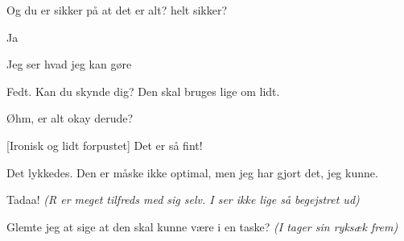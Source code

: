 \documentclass[a4paper,11pt]{article}
\begin{document}
\begin{sketch}
 Og du er sikker på at det er alt? helt sikker?

 Ja

 Jeg ser hvad jeg kan gøre 

 Fedt. Kan du skynde dig? Den skal bruges lige om lidt. 


 Øhm, er alt okay derude? 


[Ironisk og lidt forpustet] Det er så fint!


 Det lykkedes. Den er måske ikke optimal, men jeg har gjort det, jeg kunne. 


 Tadaa! \emph{(R er meget tilfreds med sig selv. I ser ikke lige så begejstret ud)}

 Glemte jeg at sige at den skal kunne være i en taske? \emph{(I tager sin ryksæk frem)}

\end{sketch}
\end{document}
